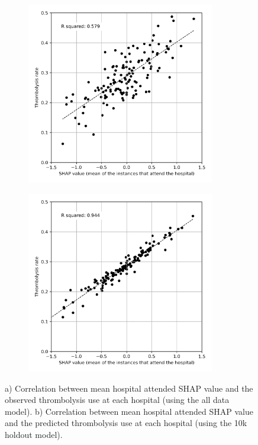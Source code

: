 \begin{figure}[!h]
\centering
\begin{subfigure}{.49\textwidth}
  \centering
    \includegraphics[width=0.9\textwidth]{./images/03c_xgb_10_features_attended_hosp_shap_value}
    \caption{}
  \label{fig:shap_correlation_subfigure_a}
\end{subfigure}
\begin{subfigure}{.49\textwidth}
  \centering
    \includegraphics[width=0.9\textwidth]{./images/04_xgb_10_features_10k_cohort_attended_hosp_shap_value}
    \caption{}
  \label{fig:shap_correlation_subfigure_b}
\end{subfigure}
\caption{a) Correlation between mean hospital attended SHAP value and the observed thrombolysis use at each hospital (using the all data model). b) Correlation between mean hospital attended SHAP value and the predicted thrombolysis use at each hospital (using the 10k holdout model).}
\end{figure}


